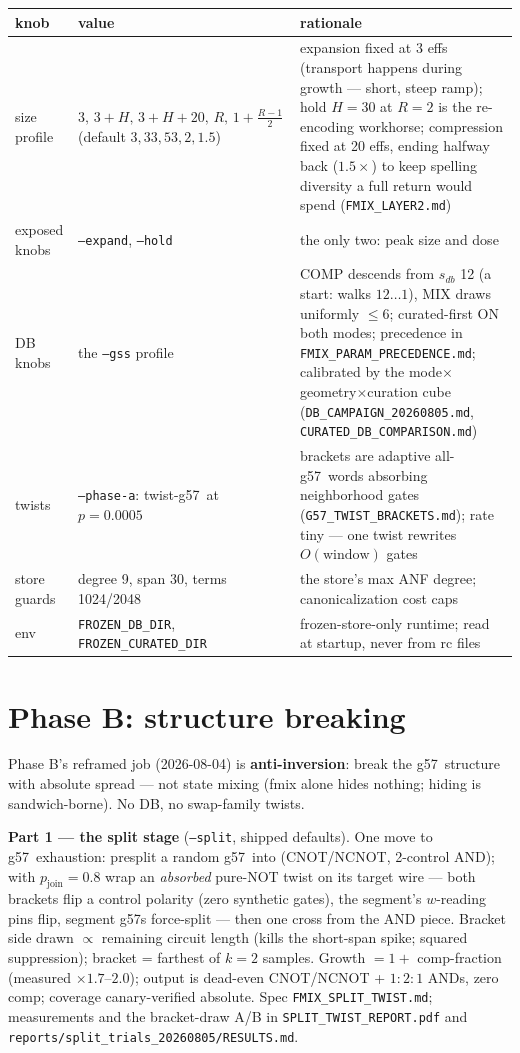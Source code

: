 \documentclass[11pt]{article}
\newcommand{\g}{\textsf{g57}}
\newcommand{\doc}[1]{\texttt{#1}}
\begin{document}
\begin{table}[H]\small
\begin{tabular}{L{3.2cm} L{4.2cm} L{7.2cm}}
\toprule
knob & value & rationale \\
\midrule
size profile & $3,\,3{+}H,\,3{+}H{+}20,\,R,\,1{+}\frac{R-1}{2}$ (default $3,33,53,2,1.5$) & expansion fixed at 3 effs (transport happens during growth --- short, steep ramp); hold $H{=}30$ at $R{=}2$ is the re-encoding workhorse; compression fixed at 20 effs, ending halfway back ($1.5\times$) to keep spelling diversity a full return would spend (\doc{FMIX\_LAYER2.md}) \\
exposed knobs & \texttt{--expand}, \texttt{--hold} & the only two: peak size and dose \\
DB knobs & the \texttt{--gss} profile & COMP descends from $s_{db}$ 12 (a start: walks $12\ldots1$), MIX draws uniformly $\le 6$; curated-first ON both modes; precedence in \doc{FMIX\_PARAM\_PRECEDENCE.md}; calibrated by the mode$\times$geometry$\times$curation cube (\doc{DB\_CAMPAIGN\_20260805.md}, \doc{CURATED\_DB\_COMPARISON.md}) \\
twists & \texttt{--phase-a}: twist-\g\ at $p=0.0005$ & brackets are adaptive all-\g\ words absorbing neighborhood gates (\doc{G57\_TWIST\_BRACKETS.md}); rate tiny --- one twist rewrites $O(\mathrm{window})$ gates \\
store guards & degree 9, span 30, terms 1024/2048 & the store's max ANF degree; canonicalization cost caps \\
env & \texttt{FROZEN\_DB\_DIR}, \texttt{FROZEN\_CURATED\_DIR} & frozen-store-only runtime; read at startup, never from rc files \\
\bottomrule
\end{tabular}
\end{table}

\section{Phase B: structure breaking}

Phase B's reframed job (2026-08-04) is \textbf{anti-inversion}: break the
\g\ structure with absolute spread --- not state mixing (fmix alone hides
nothing; hiding is sandwich-borne). No DB, no swap-family twists.

\textbf{Part 1 --- the split stage} (\texttt{--split}, shipped defaults).
One move to \g\ exhaustion: presplit a random \g\ into (CNOT/NCNOT,
2-control AND); with $p_{\mathrm{join}}=0.8$ wrap an \emph{absorbed}
pure-NOT twist on its target wire --- both brackets flip a control
polarity (zero synthetic gates), the segment's $w$-reading pins flip,
segment \g s force-split --- then one cross from the AND piece. Bracket
side drawn $\propto$ remaining circuit length (kills the short-span spike;
squared suppression); bracket = farthest of $k{=}2$ samples. Growth
$= 1+$ comp-fraction (measured $\times1.7$--$2.0$); output is dead-even
CNOT/NCNOT + $1{:}2{:}1$ ANDs, zero comp; coverage canary-verified
absolute. Spec \doc{FMIX\_SPLIT\_TWIST.md}; measurements and the
bracket-draw A/B in \doc{SPLIT\_TWIST\_REPORT.pdf} and
\doc{reports/split\_trials\_20260805/RESULTS.md}.
\end{document}
